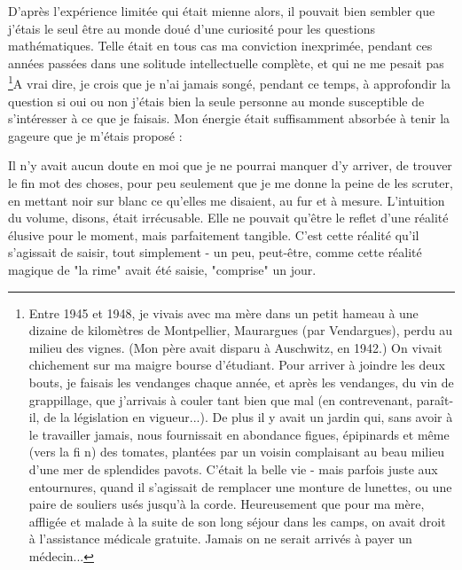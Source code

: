 D’après l’expérience limitée qui était mienne alors, il pouvait bien sembler que j’étais le seul être au monde doué d’une curiosité pour les questions mathématiques. Telle était en tous cas ma conviction inexprimée, pendant ces années passées dans une solitude intellectuelle complète, et qui ne me pesait pas \footnote{
    Entre 1945 et 1948, je vivais avec ma mère dans un petit hameau à une dizaine de kilomètres de Montpellier, Maurargues (par Vendargues), perdu au milieu des vignes. (Mon père avait disparu à Auschwitz, en 1942.) On vivait chichement sur ma maigre bourse d’étudiant. Pour arriver à joindre les deux bouts, je faisais les vendanges chaque année, et après les vendanges, du vin de grappillage, que j’arrivais à couler tant bien que mal (en contrevenant, paraît-il, de la législation en vigueur...). De plus il y avait un jardin qui, sans avoir à le travailler jamais, nous fournissait en abondance figues, épipinards et même (vers la fi n) des tomates, plantées par un voisin complaisant au beau milieu d’une mer de splendides pavots. C’était la belle vie - mais parfois juste aux entournures, quand il s’agissait de remplacer une monture de lunettes, ou une paire de souliers usés jusqu’à la corde. Heureusement que pour ma mère, affligée et malade à la suite de son long séjour dans les camps, on avait droit à l’assistance médicale gratuite. Jamais on ne serait arrivés à payer un médecin...
}A vrai dire, je crois que je n’ai jamais songé, pendant ce temps, à approfondir la question si oui ou non j’étais bien la seule personne au monde susceptible de s’intéresser à ce que je faisais. Mon énergie était suffisamment absorbée à tenir la gageure que je m’étais proposé : 

Il n’y avait aucun doute en moi que je ne pourrai manquer d’y arriver, de trouver le fin mot des choses, pour peu seulement que je me donne la peine de les scruter, en mettant noir sur blanc ce qu’elles me disaient, au fur et à mesure. L’intuition du volume, disons, était irrécusable. Elle ne pouvait qu’être le reflet d’une réalité élusive pour le moment, mais parfaitement tangible. C’est cette réalité qu’il s’agissait de saisir, tout simplement - un peu, peut-être, comme cette réalité magique de "la rime" avait été saisie, "comprise" un jour.


